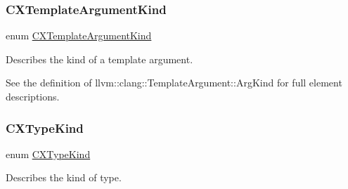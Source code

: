 \subsubsection{\texorpdfstring{C\+X\+Template\+Argument\+Kind}{CXTemplateArgumentKind}}
{\footnotesize\ttfamily enum \mbox{\hyperlink{group__CINDEX__TYPES_gaf23c39e68c1fc756643583b43ee3e494}{C\+X\+Template\+Argument\+Kind}}}



Describes the kind of a template argument. 

See the definition of llvm\+::clang\+::\+Template\+Argument\+::\+Arg\+Kind for full element descriptions. \mbox{\label{group__CINDEX__TYPES_gaad39de597b13a18882c21860f92b095a}} 
\subsubsection{\texorpdfstring{C\+X\+Type\+Kind}{CXTypeKind}}
{\footnotesize\ttfamily enum \mbox{\hyperlink{group__CINDEX__TYPES_gaad39de597b13a18882c21860f92b095a}{C\+X\+Type\+Kind}}}



Describes the kind of type. 

